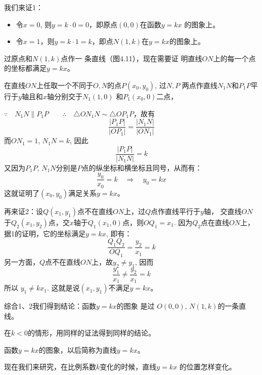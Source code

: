 我们来证1：
\begin{itemize}
    \item 令$x=0$, 则$y=k\cdot 0=0$，即原点$(0,0)$在函数$y=kx$
的图象上。
\item 令$x=1$，则$y=k\cdot 1=k$，即点$N(1,k)$在$y=kx$的图象上。
\end{itemize}

过原点和$N(1,k)$点作一
条直线（图4.11），现在需要证
明直线$ON$上的每一个点的坐标都满足$y=kx$。

\begin{figure}[htp]
    \centering
{}
    \caption{}
\end{figure}

在直线$ON$上任取一个不同于$O,N$的点$P(x_0,y_0)$, 过$N,P$
两点作直线$N_1N$和$P_1P$平行于$y$轴且和$x$轴分别交于$N_1(1,0)$
和$P_1(x_0,0)$二点，

$\because\quad N_1N\parallel P_1P\qquad \therefore\quad \triangle ON_1N\sim \triangle OP_1P$，故有
\[\frac{|P_1P|}{|OP_1|}=\frac{|N_1N|}{|ON_1|}\]
而$ON_1=1$, $N_1N=k$, 因此
\[\frac{|P_1P|}{|N_1N|}=k\]
又因为$P_1P$, $N_1N$分别是$P$点的纵坐标和横坐标且同号，从而有：
\[\frac{y_0}{x_0}=k\quad \Rightarrow\quad y_0=kx\]
这就证明了$(x_0,y_0)$满足关系$y=kx$。

再来证2：设$Q(x_1,y_1)$点不在直线$ON$上，过$Q$点作直线平行于$y$轴，
交直线$ON$于$Q_2(x_1,y_2)$点，交$x$轴于$Q_1(x_1,0)$点，则$OQ_1=
x_1$. 因为$Q_2$点在直线$ON$上，据1的证明，它的坐标满足$y=
kx$, 即有：
\[\frac{Q_1Q_2}{OQ_1}=\frac{y_2}{x_1}=k\]
另一方面，$Q$点不在直线$ON$上，故$y_2\ne y_1$, 因而
\[\frac{y_1}{x_1}\ne \frac{y_2}{x_1}=k\]
所以 $y_1\ne kx_1$. 这就是说$(x_1,y_1)$不满足$y=kx$。

综合1、2我们得到结论：函数$y=kx$的图象 是过
$O(0,0)$, $N(1,k)$的一条直线。

在$k<0$的情形，用同样的证法得到同样的结论。

函数$y=kx$的图象，以后简称为直线$y=kx$。

现在我们来研究，在比例系数$k$变化的时候，直线$y=kx$
的位置怎样变化。


